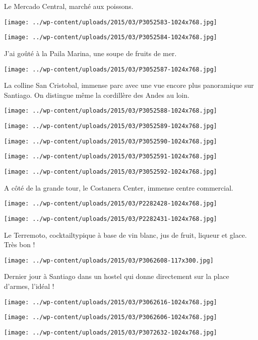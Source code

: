 Le Mercado Central, marché aux poissons. \newline
\centerline{\texttt{[image: ../wp-content/uploads/2015/03/P3052583-1024x768.jpg]} } 
 \newline
\centerline{\texttt{[image: ../wp-content/uploads/2015/03/P3052584-1024x768.jpg]} } 
J'ai goûté à la Paila Marina, une soupe de fruits de mer. \newline
\centerline{\texttt{[image: ../wp-content/uploads/2015/03/P3052587-1024x768.jpg]} } 
La colline San Cristobal, immense parc avec une vue encore plus panoramique sur Santiago. On distingue même la cordillère des Andes au loin. \newline
\centerline{\texttt{[image: ../wp-content/uploads/2015/03/P3052588-1024x768.jpg]} } 
 \newline
\centerline{\texttt{[image: ../wp-content/uploads/2015/03/P3052589-1024x768.jpg]} } 
 \newline
\centerline{\texttt{[image: ../wp-content/uploads/2015/03/P3052590-1024x768.jpg]} } 
 \newline
\centerline{\texttt{[image: ../wp-content/uploads/2015/03/P3052591-1024x768.jpg]} } 
 \newline
\centerline{\texttt{[image: ../wp-content/uploads/2015/03/P3052592-1024x768.jpg]} } 
A côté de la grande tour, le Costanera Center, immense centre commercial. \newline
\centerline{\texttt{[image: ../wp-content/uploads/2015/03/P2282428-1024x768.jpg]} } 
 \newline
\centerline{\texttt{[image: ../wp-content/uploads/2015/03/P2282431-1024x768.jpg]} } 
 Le Terremoto, cocktailtypique à base de vin blanc, jus de fruit, liqueur et glace. Très bon ! \newline
\centerline{\texttt{[image: ../wp-content/uploads/2015/03/P3062608-117x300.jpg]} } 
 Dernier jour à Santiago dans un hostel qui donne directement sur la place d'armes, l'idéal ! \newline
\centerline{\texttt{[image: ../wp-content/uploads/2015/03/P3062616-1024x768.jpg]} } 
 \newline
\centerline{\texttt{[image: ../wp-content/uploads/2015/03/P3062606-1024x768.jpg]} } 
 \newline
\centerline{\texttt{[image: ../wp-content/uploads/2015/03/P3072632-1024x768.jpg]} } 
